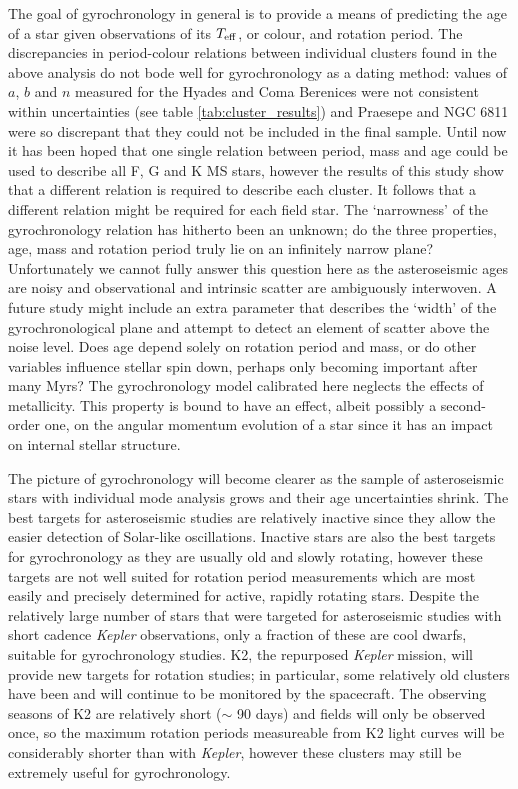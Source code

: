 \documentclass[11pt,preprint]{aastex}
\newcommand{\teff}{$T_{\rm{eff}}$}
\begin{document}
The goal of gyrochronology in general is to provide a means of predicting the age of a star given observations of its \teff, or colour, and rotation period.
The discrepancies in period-colour relations between individual clusters found in the above analysis do not bode well for gyrochronology as a dating method: values of $a$, $b$ and $n$ measured for the Hyades and Coma Berenices were not consistent within uncertainties (see table \ref{tab:cluster_results}) and Praesepe and NGC 6811 were so discrepant that they could not be included in the final sample.
Until now it has been hoped that one single relation between period, mass and age could be used to describe all F, G and K MS stars, however the results of this study show that a different relation is required to describe each cluster.
It follows that a different relation might be required for each field star.
The `narrowness' of the gyrochronology relation has hitherto been an unknown; do the three properties, age, mass and rotation period truly lie on an infinitely narrow plane?
Unfortunately we cannot fully answer this question here as the asteroseismic ages are noisy and observational and intrinsic scatter are ambiguously interwoven.
A future study might include an extra parameter that describes the `width' of the gyrochronological plane and attempt to detect an element of scatter above the noise level.
Does age depend solely on rotation period and mass, or do other variables influence stellar spin down, perhaps only becoming important after many Myrs?
The gyrochronology model calibrated here neglects the effects of metallicity.
This property is bound to have an effect, albeit possibly a second-order one, on the angular momentum evolution of a star since it has an impact on internal stellar structure.

The picture of gyrochronology will become clearer as the sample of asteroseismic stars with individual mode analysis grows and their age uncertainties shrink.
The best targets for asteroseismic studies are relatively inactive since they allow the easier detection of Solar-like oscillations.
Inactive stars are also the best targets for gyrochronology as they are usually old and slowly rotating, however these targets are not well suited for rotation period measurements which are most easily and precisely determined for active, rapidly rotating stars.
Despite the relatively large number of stars that were targeted for asteroseismic studies with short cadence {\it Kepler} observations, only a fraction of these are cool dwarfs, suitable for gyrochronology studies.
K2, the repurposed {\it Kepler} mission, will provide new targets for rotation studies; in particular, some relatively old clusters have been and will continue to be monitored by the spacecraft.
The observing seasons of K2 are relatively short ($\sim$ 90 days) and fields will only be observed once, so the maximum rotation periods measureable from K2 light curves will be considerably shorter than with {\it Kepler}, however these clusters may still be extremely useful for gyrochronology.
\end{document}
